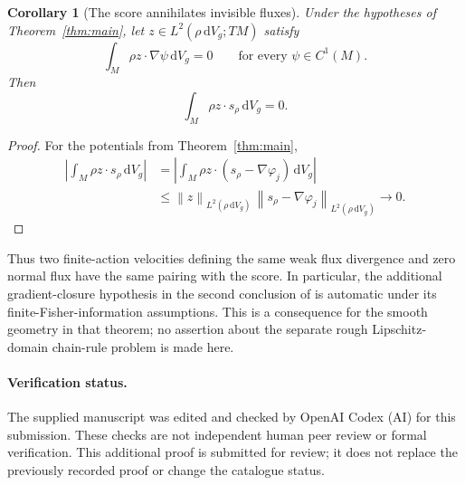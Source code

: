 \documentclass[11pt]{article}
\newtheorem{corollary}[theorem]{Corollary}
\newcommand{\dd}{\,\mathrm{d}}
\newcommand{\dV}{\dd V_g}
\newcommand{\normrho}[1]{\left\lVert #1\right\rVert_{L^2(\rho\,\mathrm{d}V_g)}}
\begin{document}
\begin{corollary}[The score annihilates invisible fluxes]\label{cor:flux}
Under the hypotheses of Theorem~\ref{thm:main}, let $z\in L^2(\rho\,\mathrm{d}V_g;TM)$ satisfy
\[
 \int_M\rho z\cdot\nabla\psi\dV=0
 \qquad\text{for every }\psi\in C^1(M).
\]
Then
\[
 \int_M\rho z\cdot s_\rho\dV=0.
\]
\end{corollary}
\begin{proof}
For the potentials from Theorem~\ref{thm:main},
\begin{align*}
 \left|\int_M\rho z\cdot s_\rho\dV\right|
 &=\left|\int_M\rho z\cdot(s_\rho-\nabla\varphi_j)\dV\right|\\
 &\leq\normrho{z}\,\normrho{s_\rho-\nabla\varphi_j}
 \longrightarrow0.
\end{align*}
\end{proof}
Thus two finite-action velocities defining the same weak flux divergence and zero normal flux have the same pairing with the score. In particular, the additional gradient-closure hypothesis in the second conclusion of \cite[Theorem 4]{CFM} is automatic under its finite-Fisher-information assumptions. This is a consequence for the smooth geometry in that theorem; no assertion about the separate rough Lipschitz-domain chain-rule problem is made here.

\paragraph{Verification status.}
The supplied manuscript was edited and checked by OpenAI Codex (AI) for this submission. These checks are not independent human peer review or formal verification. This additional proof is submitted for review; it does not replace the previously recorded proof or change the catalogue status.
\end{document}
